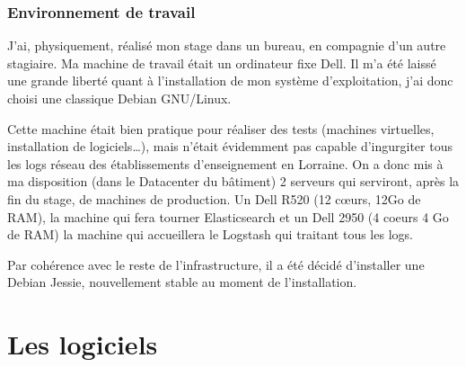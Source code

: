 \documentclass[a4paper,12pt,one side,titlepage]{report}
\begin{document}
\section{Environnement de travail}
J'ai, physiquement, réalisé mon stage dans un bureau, en compagnie d'un autre stagiaire.
Ma machine de travail était un ordinateur fixe Dell. Il m'a été laissé une grande 
liberté quant à l'installation de mon système d'exploitation, j'ai donc choisi une 
classique Debian GNU/Linux.

Cette machine était bien pratique pour réaliser des tests (machines virtuelles, 
installation de logiciels\ldots), mais n'était évidemment pas capable d'ingurgiter 
tous les logs réseau des établissements d'enseignement en Lorraine. On a donc mis 
à ma disposition (dans le Datacenter du bâtiment) 2 serveurs qui serviront, après 
la fin du stage, de machines de production. Un Dell R520 (12 cœurs, 12Go de RAM),
la machine qui fera tourner Elasticsearch et un Dell 2950 (4 coeurs 4 Go de RAM)
la machine qui accueillera le Logstash qui traitant tous les logs.

Par cohérence avec le reste de l'infrastructure, il a été décidé d'installer une 
Debian Jessie, nouvellement stable au moment de l'installation.
%
%
%
%

\part{Les logiciels}
\end{document}
